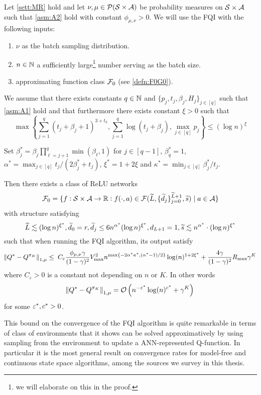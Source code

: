 \begin{thm} \label{thm:main}
  Let \cref{sett:MR} hold and let
  $\nu, \mu \in \mathcal{P}(\mathcal{S} \times \mathcal{A})$ be probability
  measures on $\mathcal{S} \times \mathcal{A}$ such that
  \cref{asm:A2} hold with constant $\phi_{\mu, \nu} > 0$.
  We will use the FQI with the following inputs:
  \begin{enumerate}
    \item $\nu$ as the batch sampling distribution.
    \item $n \in \mathbb{N}$ a sufficiently
      large\footnote{we will elaborate on this in the proof.}
      number serving as the batch size.
    \item approximating function class $\mathcal{F}_0$ (see \cref{defn:F0G0}).
  \end{enumerate}
  We assume that there exists constants
  $q \in \mathbb{N}$ and
  $\{p_j, t_j, \beta_j, H_j\}_{j \in [q]}$
  such that \cref{asm:A1} hold and that furthermore
  there exists constant $\xi > 0$
  such that
  \[ \max \left\{ \sum_{j=1}^q (t_j + \beta_j + 1)^{3 + t_k},
      \sum_{j=1}^q \log (t_j + \beta_j),
      \max_{j \in [q]} p_j
  \right\} \leq (\log n)^\xi \] 

  Set $\beta^*_j = \beta_j \prod_{\ell = j+1}^q \min(\beta_\ell, 1)$
  for $j\in [q-1]$, $\beta^*_q = 1$,
  $\alpha^* = \max_{j \in [q]} t_j/(2\beta^*_j + t_j)$, 
  $\xi^* = 1 + 2\xi$ and $\kappa^* = \min_{j\in [q]} \beta^*_j/t_j$.

  Then there exists a class of ReLU networks
  \[ \mathcal{F}_0 = \{f : \mathcal{S} \times \mathcal{A} \to \mathbb{R} : f(\cdot, a) \in 
  \mathcal{F}(\widetilde{L}, \{\widetilde{d}_j\}_{j=0}^{\widetilde{L}+1},\widetilde{s}) \mid a \in \mathcal{A} \} \]
  with structure satisfying
  \[ \widetilde{L} \lesssim (\log n)^{\xi^*},
    \widetilde{d}_0 = r, \widetilde{d}_j \leq 6 n^{\alpha^*} (\log n)^{\xi^*},
  d_{L+1} = 1, \widetilde{s} \lesssim n^{\alpha^*} \cdot (\log n)^{\xi^*} \]
  such that when running the FQI algorithm, its output satisfy
  \[ \norm{Q^* - Q^{\pi_K}}_{1, \mu} \leq \;
    C_{\varepsilon} \frac{\phi_{\mu, \nu} \gamma}{(1-\gamma)^2} V_{\max}^2
    n^{\max\{-2\alpha^*\kappa^*, (\alpha^*  - 1)/2 \}} \log(n)^{1+2\xi^*}
    + \frac{4 \gamma}{(1-\gamma)^2} R_{\max} \gamma^K
  \]
  where $C_{\varepsilon}>0$ is a constant not depending on $n$ or $K$.
  In other words
  \[ \norm{Q^* - Q^{\pi_K}}_{1, \mu} =
  \mathcal{O}\left( n^{-\varepsilon^*} \log(n)^{c^*} + \gamma^K \right) \]
  for some $\varepsilon^*, c^* > 0$.
\end{thm}

This bound on the convergence of the FQI algorithm
is quite remarkable in terms of class
of environments that it shows can be solved approximatively by using
sampling from the environment to update a ANN-represented Q-function.
In particular it is the most general result on convergence rates for
model-free and continuous state space algorithms,
among the sources we survey in this thesis.

